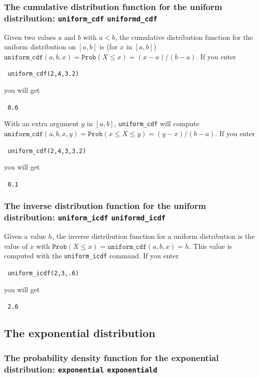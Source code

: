 \documentclass[a4paper,11pt]{book}
\begin{document}
\subsubsection{The cumulative distribution function for the uniform
distribution: \texttt{uniform\_cdf} \texttt{uniformd\_cdf}}

Given two values $a$ and $b$ with $a <b$, the cumulative distribution
function for the uniform distribution on $[a,b]$ is (for $x$ in $[a,b]$)
$\texttt{uniform\_cdf}(a,b,x) = \texttt{Prob}(X \le x) = (x-a)/(b-a)$.
If you enter
\begin{center}
  \tt
  uniform\_cdf(2,4,3.2)
\end{center}
you will get
\begin{center}
  \tt
  0.6
\end{center}

With an extra argument $y$ in $[a,b]$, \texttt{uniform\_cdf} will
compute $\texttt{uniform\_cdf}(a,b,x,y) = \texttt{Prob}(x \le X \le y)
= (y-x)/(b-a)$.  If you enter
\begin{center}
  \tt
  uniform\_cdf(2,4,3,3.2)
\end{center}
you will get
\begin{center}
  \tt
  0.1
\end{center}

\subsubsection{The inverse distribution function for the
uniform distribution: \texttt{uniform\_icdf} \texttt{uniformd\_icdf}}

Given a value $h$, the inverse distribution function for a uniform
distribution is the value of $x$ with $\texttt{Prob}(X \le x) =
\texttt{uniform\_cdf}(a,b,x) = h$.  This value is computed with the 
\texttt{uniform\_icdf} command.  If you enter
\begin{center}
  \tt
  uniform\_icdf(2,3,.6)
\end{center}
you will get
\begin{center}
  \tt
  2.6
\end{center}

\subsection{The exponential distribution}

\subsubsection{The probability density function for the exponential distribution: \texttt{exponential} \texttt{exponentiald}}
\end{document}
